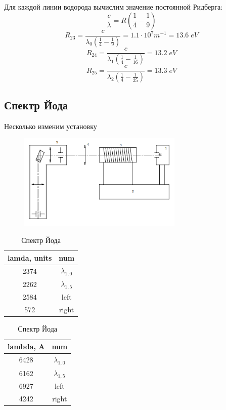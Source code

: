 \documentclass{article}
\begin{document}
Для каждой линии водорода вычислим значение постоянной Ридберга:
\[ \frac{c}{\lambda} = R \left( \frac{1}{4} - \frac{1}{9} \right) \]
\[ R_{23} = \frac{c}{\lambda_0\left( \frac{1}{4} - \frac{1}{9} \right)} = 1.1\cdot10^{7} m^{-1} = 13.6\;eV \]
\[ R_{24} = \frac{c}{\lambda_1\left( \frac{1}{4} - \frac{1}{16} \right)} = 13.2\;eV \]
\[ R_{25} = \frac{c}{\lambda_2\left( \frac{1}{4} - \frac{1}{25} \right)} = 13.3\;eV  \]
\subsection{Спектр Йода}
Несколько изменим установку

\begin{figure}[H]
	\centering
	\includegraphics[width=0.7\textwidth]{scheme-iodine.png}
\end{figure}

\begin{table}[H]
	\centering
\begin{tabular}{|c|c|}
	\hline
lamda, units & num							\\\hline
	2374         & \(\lambda_{1,0}\) \\\hline
2262         &  \(\lambda_{1,5}\)	\\\hline
2584         & left							\\\hline
572          & right						\\\hline
\end{tabular}
	\caption{Спектр Йода}
\end{table}

\begin{table}[H]
	\centering
\begin{tabular}{|c|c|}
	\hline
lambda, A         & num \\\hline
6428 & \(\lambda_{1,0}\)   \\\hline
6162 & \(\lambda_{1,5}\)   \\\hline
6927 & left					    \\\hline
4242 & right						\\\hline
\end{tabular}
	\caption{Спектр Йода}
\end{table}
\end{document}
